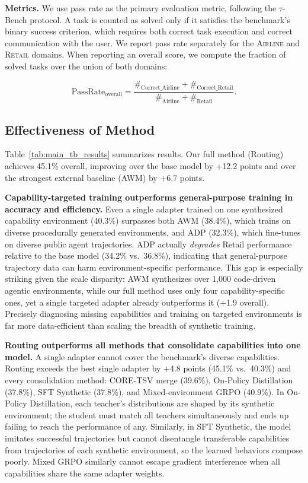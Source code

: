 \noindent\textbf{Metrics.}
We use pass rate as the primary evaluation metric, following the $\tau$-Bench protocol. A task is counted as solved only if it satisfies the benchmark's binary success criterion, which requires both correct task execution and correct communication with the user. We report pass rate separately for the \textsc{Airline} and \textsc{Retail} domains. When reporting an overall score, we compute the fraction of solved tasks over the union of both domains:

\[
\mathrm{PassRate}_{\mathrm{overall}}
=
\frac{\#_{\mathrm{Correct}\_{\mathrm{Airline}}} + \#_{\mathrm{Correct}\_{\mathrm{Retail}}}}{\#_{\mathrm{Airline}} + \#_{\mathrm{Retail}}}.
\]




\subsection{Effectiveness of Method}

Table~\ref{tab:main_tb_results} summarizes results. Our full method (Routing) achieves 45.1\% overall, improving over the base model by +12.2 points and over the strongest external baseline (AWM) by +6.7 points.

\noindent\textbf{Capability-targeted training outperforms general-purpose training in accuracy and efficiency.}
Even a single adapter trained on one synthesized capability environment (40.3\%) surpasses both AWM (38.4\%), which trains on diverse procedurally generated environments, and ADP (32.3\%), which fine-tunes on diverse public agent trajectories. ADP actually \emph{degrades} Retail performance relative to the base model (34.2\% vs.\ 36.8\%), indicating that general-purpose trajectory data can harm environment-specific performance. This gap is especially striking given the scale disparity: AWM synthesizes over 1{,}000 code-driven agentic environments, while our full method uses only four capability-specific ones, yet a single targeted adapter already outperforms it (+1.9 overall). Precisely diagnosing missing capabilities and training on targeted environments is far more data-efficient than scaling the breadth of synthetic training.

\noindent\textbf{Routing outperforms all methods that consolidate capabilities into one model.}
A single adapter cannot cover the benchmark's diverse capabilities. Routing exceeds the best single adapter by +4.8 points (45.1\% vs.\ 40.3\%) and every consolidation method: CORE-TSV merge (39.6\%), On-Policy Distillation (37.8\%), SFT Synthetic (37.8\%), and Mixed-environment GRPO (40.9\%). In On-Policy Distillation, each teacher's distributions are shaped by its synthetic environment; the student must match all teachers simultaneously and ends up failing to reach the performance of any. Similarly, in SFT Synthetic, the model imitates successful trajectories but cannot disentangle transferable capabilities from trajectories of each synthetic environment, so the learned behaviors compose poorly. Mixed GRPO similarly cannot escape gradient interference when all capabilities share the same adapter weights. 

